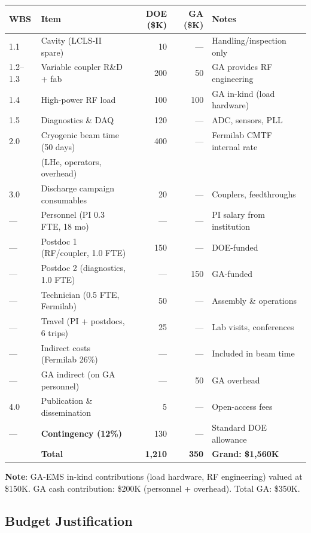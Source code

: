 \documentclass[11pt]{article}
\begin{document}
\begin{center}
\begin{tabular}{llrrl}
\toprule
WBS & Item & DOE (\$K) & GA (\$K) & Notes \\
\midrule
1.1 & Cavity (LCLS-II spare) & 10 & --- & Handling/inspection only \\
1.2--1.3 & Variable coupler R\&D + fab & 200 & 50 & GA provides RF engineering \\
1.4 & High-power RF load & 100 & 100 & GA in-kind (load hardware) \\
1.5 & Diagnostics \& DAQ & 120 & --- & ADC, sensors, PLL \\
2.0 & Cryogenic beam time (50 days) & 400 & --- & Fermilab CMTF internal rate \\
& \quad (LHe, operators, overhead) & & & \\
3.0 & Discharge campaign consumables & 20 & --- & Couplers, feedthroughs \\
--- & Personnel (PI 0.3 FTE, 18 mo) & --- & --- & PI salary from institution \\
--- & Postdoc 1 (RF/coupler, 1.0 FTE) & 150 & --- & DOE-funded \\
--- & Postdoc 2 (diagnostics, 1.0 FTE) & --- & 150 & GA-funded \\
--- & Technician (0.5 FTE, Fermilab) & 50 & --- & Assembly \& operations \\
--- & Travel (PI + postdocs, 6 trips) & 25 & --- & Lab visits, conferences \\
--- & Indirect costs (Fermilab 26\%) & --- & --- & Included in beam time \\
--- & GA indirect (on GA personnel) & --- & 50 & GA overhead \\
4.0 & Publication \& dissemination & 5 & --- & Open-access fees \\
--- & \textbf{Contingency (12\%)} & 130 & --- & Standard DOE allowance \\
\midrule
& \textbf{Total} & \textbf{1,210} & \textbf{350} & \textbf{Grand: \$1,560K} \\
\bottomrule
\end{tabular}
\end{center}

\textbf{Note}: GA-EMS in-kind contributions (load hardware, RF
engineering) valued at \$150K. GA cash contribution: \$200K
(personnel + overhead). Total GA: \$350K.

\subsection{Budget Justification}
\end{document}
